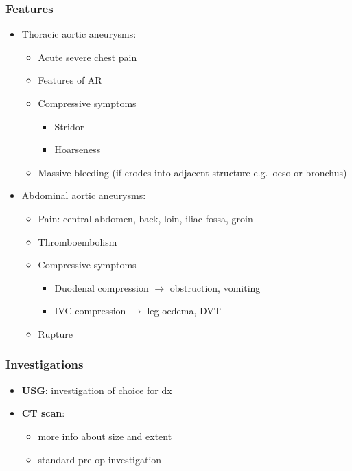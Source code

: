 \documentclass[
  12pt,
]{memoir}
\providecommand{\tightlist}{%
  \setlength{\itemsep}{0pt}\setlength{\parskip}{0pt}}
\begin{document}
\hypertarget{features-3}{%
\subsubsection{Features}\label{features-3}}

\begin{itemize}
\tightlist
\item
  Thoracic aortic aneurysms:

  \begin{itemize}
  \tightlist
  \item
    Acute severe chest pain
  \item
    Features of AR
  \item
    Compressive symptoms

    \begin{itemize}
    \tightlist
    \item
      Stridor
    \item
      Hoarseness
    \end{itemize}
  \item
    Massive bleeding (if erodes into adjacent structure e.g.~oeso or
    bronchus)
  \end{itemize}
\item
  Abdominal aortic aneurysms:

  \begin{itemize}
  \tightlist
  \item
    Pain: central abdomen, back, loin, iliac fossa, groin
  \item
    Thromboembolism
  \item
    Compressive symptoms

    \begin{itemize}
    \tightlist
    \item
      Duodenal compression \(\rightarrow\) obstruction, vomiting
    \item
      IVC compression \(\rightarrow\) leg oedema, DVT
    \end{itemize}
  \item
    Rupture
  \end{itemize}
\end{itemize}

\hypertarget{investigations-4}{%
\subsubsection{Investigations}\label{investigations-4}}

\begin{itemize}
\tightlist
\item
  \textbf{USG}: investigation of choice for dx
\item
  \textbf{CT scan}:

  \begin{itemize}
  \tightlist
  \item
    more info about size and extent
  \item
    standard pre-op investigation
  \end{itemize}
\end{itemize}
\end{document}
